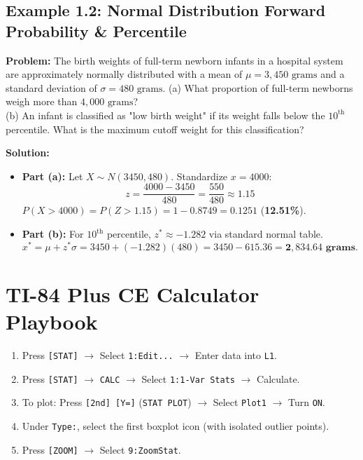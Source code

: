 \subsection*{Example 1.2: Normal Distribution Forward Probability & Percentile}
\textbf{Problem:} The birth weights of full-term newborn infants in a hospital system are approximately normally distributed with a mean of $\mu = 3,450\text{ grams}$ and a standard deviation of $\sigma = 480\text{ grams}$.
(a) What proportion of full-term newborns weigh more than $4,000\text{ grams}$?\\
(b) An infant is classified as "low birth weight" if its weight falls below the $10^{\text{th}}$ percentile. What is the maximum cutoff weight for this classification?

\textbf{Solution:}
\begin{itemize}[leftmargin=1.2em]
  \item \textbf{Part (a):} Let $X \sim N(3450, 480)$. Standardize $x = 4000$:
  \[ z = \frac{4000 - 3450}{480} = \frac{550}{480} \approx 1.15 \]
  $P(X > 4000) = P(Z > 1.15) = 1 - 0.8749 = 0.1251$ (\textbf{12.51\%}).
  \item \textbf{Part (b):} For $10^{\text{th}}$ percentile, $z^* \approx -1.282$ via standard normal table.\\
  \[ x^* = \mu + z^*\sigma = 3450 + (-1.282)(480) = 3450 - 615.36 = \mathbf{2,834.64\text{ grams}}. \]
\end{itemize}

\section{TI-84 Plus CE Calculator Playbook}

\begin{calculatorbox}
\begin{enumerate}[leftmargin=1.2em]
  \item Press \texttt{[STAT]} $\rightarrow$ Select \texttt{1:Edit...} $\rightarrow$ Enter data into \texttt{L1}.
  \item Press \texttt{[STAT]} $\rightarrow$ \texttt{CALC} $\rightarrow$ Select \texttt{1:1-Var Stats} $\rightarrow$ Calculate.
  \item To plot: Press \texttt{[2nd] [Y=]} (\texttt{STAT PLOT}) $\rightarrow$ Select \texttt{Plot1} $\rightarrow$ Turn \texttt{ON}.
  \item Under \texttt{Type:}, select the first boxplot icon (with isolated outlier points).
  \item Press \texttt{[ZOOM]} $\rightarrow$ Select \texttt{9:ZoomStat}.
\end{enumerate}
\end{calculatorbox}

